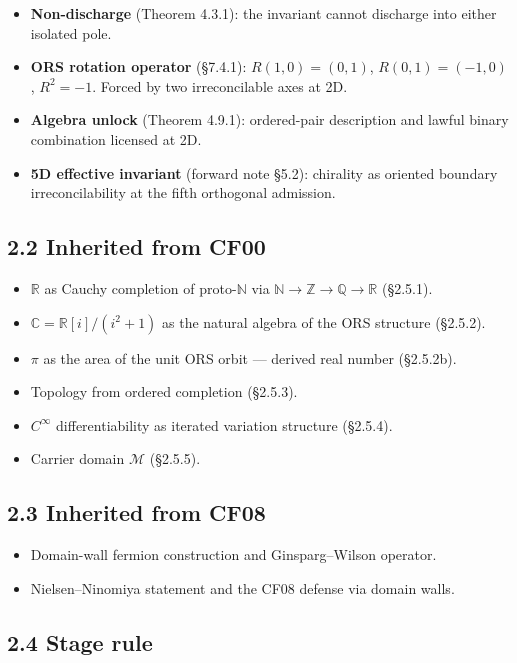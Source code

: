 \documentclass[11pt]{article}
\theoremstyle{definition}
\theoremstyle{remark}
\begin{document}
\begin{itemize}
\item \textbf{Non-discharge} (Theorem 4.3.1): the invariant cannot
  discharge into either isolated pole.
\item \textbf{ORS rotation operator} (\S 7.4.1): $R(1,0)=(0,1)$,
  $R(0,1)=(-1,0)$, $R^2=-1$. Forced by two irreconcilable axes at 2D.
\item \textbf{Algebra unlock} (Theorem 4.9.1): ordered-pair description
  and lawful binary combination licensed at 2D.
\item \textbf{5D effective invariant} (forward note \S 5.2): chirality
  as oriented boundary irreconcilability at the fifth orthogonal
  admission.
\end{itemize}

\subsection{2.2 Inherited from CF00}

\begin{itemize}
\item $\mathbb{R}$ as Cauchy completion of proto-$\mathbb{N}$ via
  $\mathbb{N}\to\mathbb{Z}\to\mathbb{Q}\to\mathbb{R}$ (\S 2.5.1).
\item $\mathbb{C}=\mathbb{R}[i]/(i^2+1)$ as the natural algebra of the
  ORS structure (\S 2.5.2).
\item $\pi$ as the area of the unit ORS orbit --- derived real number
  (\S 2.5.2b).
\item Topology from ordered completion (\S 2.5.3).
\item $C^\infty$ differentiability as iterated variation structure
  (\S 2.5.4).
\item Carrier domain $\mathcal{M}$ (\S 2.5.5).
\end{itemize}

\subsection{2.3 Inherited from CF08}

\begin{itemize}
\item Domain-wall fermion construction and Ginsparg--Wilson operator.
\item Nielsen--Ninomiya statement and the CF08 defense via domain walls.
\end{itemize}

\subsection{2.4 Stage rule}
\end{document}
